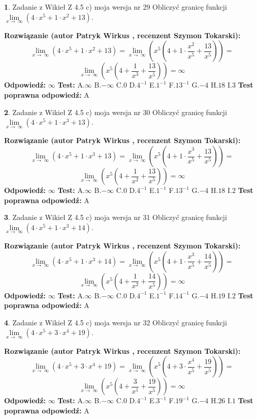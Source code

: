 \documentclass[12pt, a4paper]{article}
\theoremstyle{definition} %
\newtheorem{zad}{}
\newcommand{\zadStart}[1]{\begin{zad}#1\newline}
\newcommand{\zadStop}{\end{zad}}
\newcommand{\rozwStart}[2]{\noindent \textbf{Rozwiązanie (autor #1 , recenzent #2): }\newline}
\newcommand{\rozwStop}{\newline}
\newcommand{\odpStart}{\noindent \textbf{Odpowiedź:}\newline}
\newcommand{\odpStop}{\newline}
\newcommand{\testStart}{\noindent \textbf{Test:}\newline}
\newcommand{\testStop}{\newline}
\newcommand{\kluczStart}{\noindent \textbf{Test poprawna odpowiedź:}\newline}
\newcommand{\kluczStop}{\newline}
\begin{document}
\zadStart{Zadanie z Wikieł Z 4.5 c) moja wersja nr 29}
Obliczyć granicę funkcji  $\lim\limits_{x\to\ \infty}(4 \cdot x^{5}+1 \cdot x^{2}+13)$.
\zadStop
\rozwStart{Patryk Wirkus}{Szymon Tokarski}
$$\lim\limits_{x\to\ \infty}(4 \cdot x^{5}+1 \cdot x^{2}+13) = \lim\limits_{x\to\ \infty}(x^{5}(4 +1 \cdot \frac{x^{2}}{x^{5}}+\frac{13}{x^{5}})) =$$ $$\lim\limits_{x\to\ \infty}(x^{5}(4 +\frac{1}{x^{3}}+\frac{13}{x^{5}})) =\infty$$
\rozwStop
\odpStart
$\infty$
\odpStop
\testStart
A.$\infty$ B.$-\infty$ C.$0$ D.$4^{-1}$ E.$1^{-1}$
F.$13^{-1}$ G.$-4$
H.$18$
I.$3$
\testStop
\kluczStart
A
\kluczStop



\zadStart{Zadanie z Wikieł Z 4.5 c) moja wersja nr 30}
Obliczyć granicę funkcji  $\lim\limits_{x\to\ \infty}(4 \cdot x^{5}+1 \cdot x^{3}+13)$.
\zadStop
\rozwStart{Patryk Wirkus}{Szymon Tokarski}
$$\lim\limits_{x\to\ \infty}(4 \cdot x^{5}+1 \cdot x^{3}+13) = \lim\limits_{x\to\ \infty}(x^{5}(4 +1 \cdot \frac{x^{3}}{x^{5}}+\frac{13}{x^{5}})) =$$ $$\lim\limits_{x\to\ \infty}(x^{5}(4 +\frac{1}{x^{2}}+\frac{13}{x^{5}})) =\infty$$
\rozwStop
\odpStart
$\infty$
\odpStop
\testStart
A.$\infty$ B.$-\infty$ C.$0$ D.$4^{-1}$ E.$1^{-1}$
F.$13^{-1}$ G.$-4$
H.$18$
I.$2$
\testStop
\kluczStart
A
\kluczStop



\zadStart{Zadanie z Wikieł Z 4.5 c) moja wersja nr 31}
Obliczyć granicę funkcji  $\lim\limits_{x\to\ \infty}(4 \cdot x^{5}+1 \cdot x^{3}+14)$.
\zadStop
\rozwStart{Patryk Wirkus}{Szymon Tokarski}
$$\lim\limits_{x\to\ \infty}(4 \cdot x^{5}+1 \cdot x^{3}+14) = \lim\limits_{x\to\ \infty}(x^{5}(4 +1 \cdot \frac{x^{3}}{x^{5}}+\frac{14}{x^{5}})) =$$ $$\lim\limits_{x\to\ \infty}(x^{5}(4 +\frac{1}{x^{2}}+\frac{14}{x^{5}})) =\infty$$
\rozwStop
\odpStart
$\infty$
\odpStop
\testStart
A.$\infty$ B.$-\infty$ C.$0$ D.$4^{-1}$ E.$1^{-1}$
F.$14^{-1}$ G.$-4$
H.$19$
I.$2$
\testStop
\kluczStart
A
\kluczStop



\zadStart{Zadanie z Wikieł Z 4.5 c) moja wersja nr 32}
Obliczyć granicę funkcji  $\lim\limits_{x\to\ \infty}(4 \cdot x^{5}+3 \cdot x^{4}+19)$.
\zadStop
\rozwStart{Patryk Wirkus}{Szymon Tokarski}
$$\lim\limits_{x\to\ \infty}(4 \cdot x^{5}+3 \cdot x^{4}+19) = \lim\limits_{x\to\ \infty}(x^{5}(4 +3 \cdot \frac{x^{4}}{x^{5}}+\frac{19}{x^{5}})) =$$ $$\lim\limits_{x\to\ \infty}(x^{5}(4 +\frac{3}{x^{1}}+\frac{19}{x^{5}})) =\infty$$
\rozwStop
\odpStart
$\infty$
\odpStop
\testStart
A.$\infty$ B.$-\infty$ C.$0$ D.$4^{-1}$ E.$3^{-1}$
F.$19^{-1}$ G.$-4$
H.$26$
I.$1$
\testStop
\kluczStart
A
\kluczStop
\end{document}
